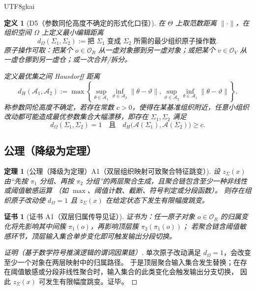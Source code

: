 \documentclass[12pt]{article}
\newtheorem{definition}{定义}[section]
\newtheorem{theorem}{定理}[section]
\newtheorem{Certificate}{证书}[section]
\begin{document}
\begin{CJK*}{UTF8}{gkai}
\begin{definition}[D5（参数同伦高度不确定的形式化口径）]
\label{def:tex28-ch8-d5}
在 $\Theta$ 上取范数距离 $\|\cdot\|$，在组织空间 $\Omega$ 上定义最小编辑距离
\[
  d_{\Omega}(\Sigma_1,\Sigma_2):=
  \text{把 }\Sigma_1\text{ 变成 }\Sigma_2\text{ 所需的最少组织原子操作数}.
\]
原子操作可取：把某个 $o\in\mathcal{O}_R$ 从一虚对象挪到另一虚对象；或把某个 $v\in\mathcal{O}_V$ 从一虚仓挪到另一虚仓；或一次合并/拆分。

定义最优集之间 Hausdorff 距离
\[
  d_H(\mathcal{A}_1,\mathcal{A}_2):=
  \max\!\left\{
  \sup_{\theta\in\mathcal{A}_1}\inf_{\vartheta\in\mathcal{A}_2}\|\theta-\vartheta\|,
  \sup_{\vartheta\in\mathcal{A}_2}\inf_{\theta\in\mathcal{A}_1}\|\theta-\vartheta\|
  \right\}.
\]
称参数同伦高度不确定，若存在常数 $c>0$，使得在某基准组织附近，任意小组织改动都可能造成最优参数集合大幅漂移，即存在
$\Sigma_1,\Sigma_2$ 满足
\[
  d_{\Omega}(\Sigma_1,\Sigma_2)=1
  \quad\text{且}\quad
  d_H\bigl(\mathcal{A}(\Sigma_1),\mathcal{A}(\Sigma_2)\bigr)\ge c.
\]
\end{definition}

\subsection{公理（降级为定理）}
\label{subsec:tex28-ch8-axioms}

\begin{theorem}[公理（降级为定理）A1（双层组织映射可致聚合特征跳变）]
\label{thm:tex28-ch8-a1}
设 $z_{\Sigma}(x)$ 由“先按 $\pi_1$ 分组、再按 $\pi_2$ 分组”的两层聚合生成，且聚合链包含至少一种非线性或阈值敏感运算
（如 $\max$、阈值计数、截断、符号判定或分段函数）。
则存在组织原子改动使 $d_{\Omega}=1$ 且 $z_{\Sigma}(x)$ 在给定状态下发生有限幅度跳变。
\end{theorem}

\begin{Certificate}[证书 A1（双层归属传导见证）]
\label{cert:tex28-ch8-a1}
证书为：任一原子对象 $o\in\mathcal{O}_R$ 的归属变化将先影响其中间簇 $\pi_1(o)$，再影响顶层簇 $\pi_2(\pi_1(o))$；
若聚合链含阈值敏感环节，顶层输入集合单步变化即可触发输出分段切换。
\end{Certificate}

\begin{proof}[证明（基于数学符号推演逻辑的谓词因果链）]
单次原子改动满足 $d_{\Omega}=1$，会改变至少一个对象在两层映射中的归属路径。
于是顶层聚合输入集合发生替换；在存在阈值敏感或分段非线性聚合时，输入集合的此类变化会触发输出分支切换，
因此 $z_{\Sigma}(x)$ 可发生有限幅度跳变。证毕。
\end{proof}


\end{CJK*}
\end{document}

